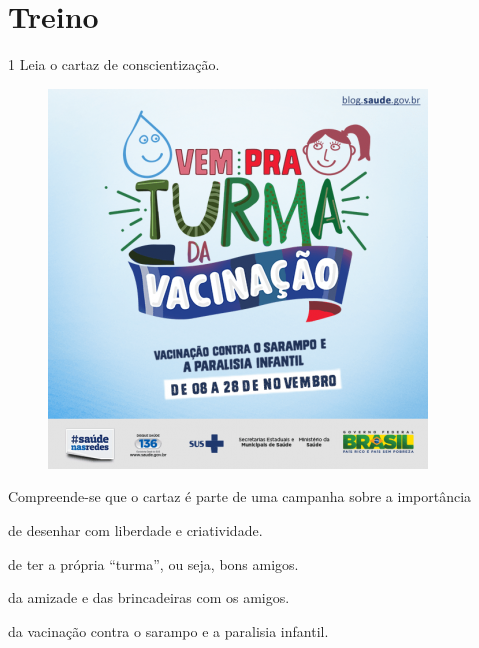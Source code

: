 \section*{Treino}

\num{1} Leia o cartaz de conscientização.


\begin{figure}[htpb!]
\centering
\includegraphics[width=.8\textwidth]{./media/image12.png}
\end{figure}


Compreende-se que o cartaz é parte de uma campanha sobre a importância

\begin{escolha}[itemsep=-5pt]
\item de desenhar com liberdade e criatividade.

\item de ter a própria ``turma'', ou seja, bons amigos.

\item da amizade e das brincadeiras com os amigos.

\item da vacinação contra o sarampo e a paralisia infantil.
\end{escolha}
\pagebreak

